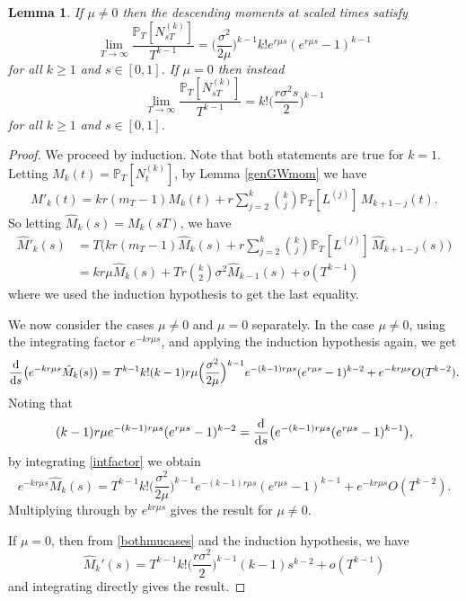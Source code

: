\documentclass{article}
\theoremstyle{plain}
\newtheorem{lem}[thm]{Lemma}
\theoremstyle{definition}
\renewcommand{\P}{\mathbb{P}}
\renewcommand{\d}{{\rm{d}}}
\begin{document}
\begin{lem}\label{scaledPmoments}
If $\mu\neq 0$ then the descending moments at scaled times satisfy
\[\lim_{T\to\infty} \frac{\P_T[N_{sT}^{(k)}]}{T^{k-1}} = \Big( \frac{\sigma^2}{2\mu} \Big)^{k-1} k! e^{r\mu s} ( e^{r\mu s} - 1 )^{k-1}\]
for all $k\ge 1$ and $s\in[0,1]$.
If $\mu = 0$ then instead
\[\lim_{T\to\infty} \frac{\P_T[N_{sT}^{(k)}]}{T^{k-1}} = k!\Big(\frac{r\sigma^2 s}{2}\Big)^{k-1}\]
for all $k\ge 1$ and $s\in[0,1]$.
\end{lem}

\begin{proof}
We proceed by induction. Note that both statements are true for $k=1$. Letting $M_k(t) = \P_T[N_t^{(k)}]$, by Lemma \ref{genGWmom} we have
\begin{align*}
M'_k(t)  =  kr(m_T-1)M_k(t) + r\sum_{j =2 }^k \binom{k}{j} \P_T[L^{(j)}]\,M_{k+1-j}(t).
\end{align*}
So letting $\hat M_k(s) = M_k(sT)$, we have
\begin{align}
\hat M'_k(s) &= T \Big(  kr(m_T-1)\hat M_k(s) + r\sum_{j =2 }^k \binom{k}{j} \P_T[L^{(j)}]\,\hat M_{k+1-j}(s)  \Big)\nonumber\\
&= k r\mu \hat M_k(s) + T r \binom{k}{2} \sigma^2 \hat M_{k-1}(s) + o(T^{k-1})\label{bothmucases}
\end{align}
where we used the induction hypothesis to get the last equality.

We now consider the cases $\mu\neq 0$ and $\mu = 0$ separately. In the case $\mu\neq 0$, using the integrating factor $e^{-kr\mu s}$, and applying the induction hypothesis again, we get
\begin{equation}\label{intfactor}
\frac{\d}{\d s}\big(e^{-kr\mu s} \hat M_k(s)\big) = T^{k-1} k! (k-1)r\mu \Big(\frac{\sigma^2}{2\mu}\Big)^{k-1} e^{-(k-1)r\mu s} (e^{r\mu s}-1)^{k-2} + e^{-kr\mu s} O(T^{k-2}).
\end{equation}
Noting that
\[(k-1)r\mu e^{-(k-1)r\mu s} (e^{r\mu s}-1)^{k-2} = \frac{\d}{\d s}\big(e^{-(k-1)r\mu s}(e^{r\mu s}-1)^{k-1}\big),\]
by integrating \eqref{intfactor} we obtain
\[e^{-kr\mu s} \hat M_k(s) = T^{k-1} k! \Big(\frac{\sigma^2}{2\mu}\Big)^{k-1}e^{-(k-1)r\mu s} (e^{r\mu s}-1)^{k-1} + e^{-kr\mu s} O(T^{k-2}).\]
Multiplying through by $e^{kr\mu s}$ gives the result for $\mu\neq 0$.

If $\mu=0$, then from \eqref{bothmucases} and the induction hypothesis, we have
\[\hat M_k'(s) = T^{k-1} k! \Big(\frac{r\sigma^2}{2}\Big)^{k-1} (k-1) s^{k-2} + o(T^{k-1})\]
and integrating directly gives the result.
\end{proof}
\end{document}
